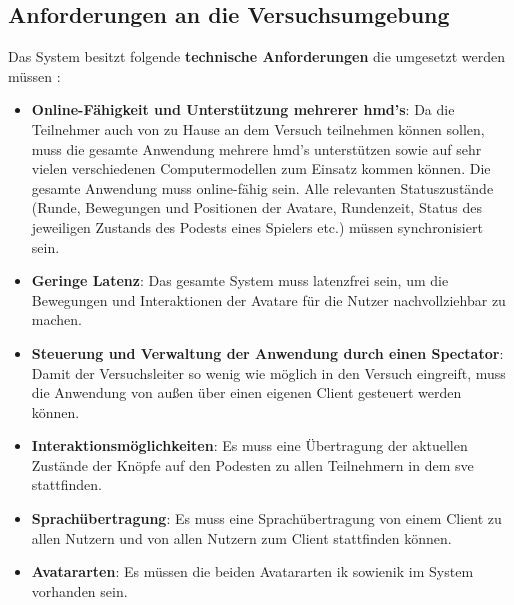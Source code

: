 \documentclass[a4paper,11pt]{article}%
\renewcommand{\\}{\vspace*{0.5\baselineskip} \newline}
\begin{document}
	\subsection{Anforderungen an die Versuchsumgebung}
\label{TechnischeAnforderungen}
Das System besitzt folgende \textbf{technische Anforderungen} die umgesetzt werden müssen :
\begin{itemize}
\item \textbf{Online-Fähigkeit und Unterstützung mehrerer \ac{hmd}'s}: Da die Teilnehmer auch von zu Hause an dem Versuch teilnehmen können sollen, muss die gesamte Anwendung mehrere \ac{hmd}'s unterstützen sowie auf sehr vielen verschiedenen Computermodellen zum Einsatz kommen können. Die gesamte Anwendung muss online-fähig sein. Alle relevanten Statuszustände (Runde, Bewegungen und Positionen der Avatare, Rundenzeit, Status des jeweiligen Zustands des Podests eines Spielers etc.) müssen synchronisiert sein.
\item \textbf{Geringe Latenz}: Das gesamte System muss latenzfrei sein, um die Bewegungen und Interaktionen der Avatare für die Nutzer nachvollziehbar zu machen.
\item \textbf{Steuerung und Verwaltung der Anwendung durch einen Spectator}: Damit der Versuchsleiter so wenig wie möglich in den Versuch eingreift, muss die Anwendung von außen über einen eigenen Client gesteuert werden können.
\item \textbf{Interaktionsmöglichkeiten}: Es muss eine Übertragung der aktuellen Zustände der Knöpfe auf den Podesten zu allen Teilnehmern in dem \ac{sve} stattfinden.
\item \textbf{Sprachübertragung}: Es muss eine Sprachübertragung von einem Client zu allen Nutzern und von allen Nutzern zum Client stattfinden können.
\item \textbf{Avatararten}: Es müssen die beiden Avatararten \ac{ik} sowie\newline \ac{nik} im System vorhanden sein.
\end{itemize}
\end{document}
